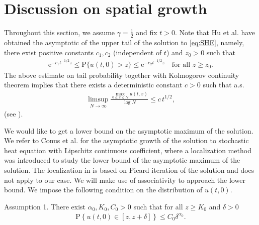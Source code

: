 \documentclass[12pt, reqno]{amsart}
\renewcommand{\P}{\mathrm{P}}
\newcommand{\<}{\langle}
\renewcommand{\>}{\rangle}
\newcommand{\e}{\mathrm{e}}
\begin{document}
\section{Discussion on spatial growth}\label{sec:max}

Throughout this section, we assume $\gamma =\frac12$ and fix $t>0$.
Note that Hu et al. \cite[Proposition 1.4]{HWXZ24} have obtained the asymptotic of the upper tail of the solution to \eqref{eq:SHE}, namely, there exist positive constants $c_1, c_2$ (independent of $t$) and $z_0>0$ such that
\begin{align}\label{eq:tail}
\e^{-c_1t^{-1/2}z} \leq  \P\{u(t, 0)>z\} \leq \e^{-c_2t^{-1/2}z}  \quad \text{for all $z\geq z_0$}.
\end{align}
The above estimate on tail probability together with Kolmogorov continuity theorem implies that there exists a deterministic constant $c>0$ such that a.s.
\begin{align*}
\limsup_{N\to\infty} \frac{\max_{0\leq x\leq N}u(t,x)}{\log N} \leq c\, t^{1/2},
\end{align*}
(see \cite[Theorem 1.11]{CX23}).

We would like to get a lower bound on the asymptotic maximum of the solution. We refer to Conus et al. \cite{CJK13}
for the asymptotic growth of the solution to stochastic heat equation with Lipschitz continuous coefficient, where a localization method was introduced to study the lower bound of the  asymptotic maximum of the solution. The localization in  \cite{CJK13} is based on Picard iteration of the solution and does not apply to our case. We will make use of associativity to approach the lower bound. We impose the following condition on the distribution of $u(t,0)$. 

\noindent Assumption 1.
There exist $\alpha_0, K_0, C_0>0$ such that for all $z\geq K_0$ and $\delta>0$
\begin{align}\label{eq:condition}
\P\left\{u(t,0) \in [z, z+\delta]\right\} \leq C_0 \delta^{\alpha_0}.
\end{align}
\end{document}
